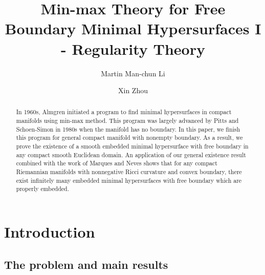 \documentclass[10pt]{amsart}
\theoremstyle{definition}
\theoremstyle{remark}
\numberwithin{equation}{section}
\begin{document}

\title[Min-max Theory for Free Boundary Minimal Hypersurfaces I]{Min-max Theory for Free Boundary Minimal Hypersurfaces I - Regularity Theory}

\author[Martin Li]{Martin Man-chun Li}
\address{Department of Mathematics, The Chinese University of Hong Kong, Shatin, N.T., Hong Kong}

\author[Xin Zhou]{Xin Zhou}
\address{Department of Mathematics, University of California Santa Barbara, Santa Barbara, CA 93106, USA}


\begin{abstract}
In 1960s, Almgren \cite{Almgren62,Almgren65} initiated a program to find minimal hypersurfaces in compact manifolds using min-max method. This program was largely advanced by Pitts \cite{Pitts} and Schoen-Simon \cite{Schoen-Simon81} in 1980s when the manifold has no boundary. In this paper, we finish this program for general compact manifold with nonempty boundary. As a result, we prove the existence of a smooth embedded minimal hypersurface with free boundary in any compact smooth Euclidean domain. An application of our general existence result combined with the work of Marques and Neves \cite{Marques-Neves17} shows that for any compact Riemannian manifolds with nonnegative Ricci curvature and convex boundary, there exist infinitely many embedded minimal hypersurfaces with free boundary which are properly embedded.
\end{abstract}

\maketitle
\tableofcontents



\section{Introduction}
\label{S:intro}

\subsection{The problem and main results}
\end{document}
